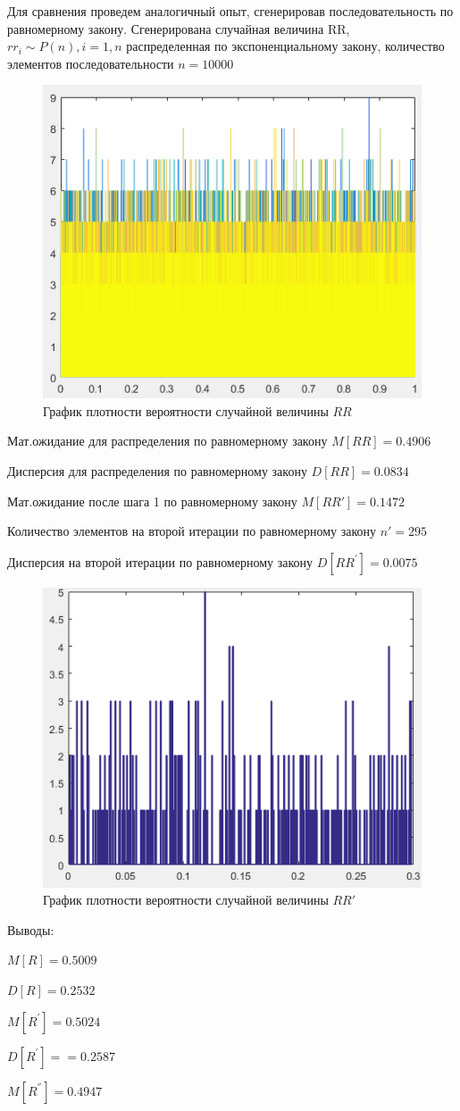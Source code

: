 Для сравнения проведем аналогичный опыт, сгенерировав последовательность
по равномерному закону. Сгенерирована случайная величина RR, $rr_{i}\sim P(n),i=1,n$
распределенная по экспоненциальному закону, количество элементов последовательности
$ n=10000  $
\begin{figure}[h]
	\centering
	\includegraphics[width=0.4\linewidth]{img/kich_bur/image6.png} 
	\caption{График плотности вероятности случайной величины $RR$ }
	\label{fig:img6}
\end{figure}

Мат.ожидание для распределения по равномерному закону $M[RR]=0.4906$ 

Дисперсия для распределения по равномерному закону $D[RR]=
0.0834 $

Мат.ожидание после шага 1 по равномерному закону $M[RR']=
0.1472 $

Количество элементов на второй итерации по равномерному закону $n'=
295 $

Дисперсия на второй итерации по равномерному закону $D[RR^{'}]=0.0075$ 
\begin{figure}[h]
	\centering
	\includegraphics[width=0.4\linewidth]{img/kich_bur/image7.png} 
	\caption{График плотности вероятности случайной величины $RR'$}
	\label{fig:img7}
\end{figure}

Выводы:

$M[R]= 0.5009 $

$D[R]= 0.2532 $


$M[R^{'}]= 0.5024$

$D[R^{'}]= = 0.2587$


$M[R^{''}]= 0.4947$

